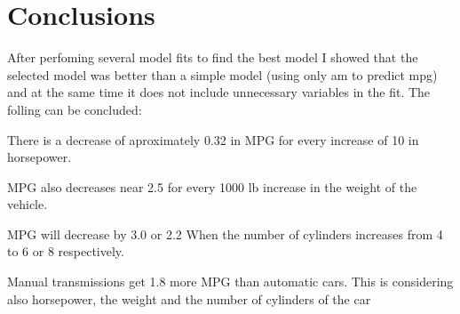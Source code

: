 \documentclass[]{article}
\begin{document}
\section{Conclusions}\label{conclusions}

After perfoming several model fits to find the best model I showed that
the selected model was better than a simple model (using only am to
predict mpg) and at the same time it does not include unnecessary
variables in the fit. The folling can be concluded:

There is a decrease of aproximately 0.32 in MPG for every increase of 10
in horsepower.

MPG also decreases near 2.5 for every 1000 lb increase in the weight of
the vehicle.

MPG will decrease by 3.0 or 2.2 When the number of cylinders increases
from 4 to 6 or 8 respectively.

Manual transmissions get 1.8 more MPG than automatic cars. This is
considering also horsepower, the weight and the number of cylinders of
the car
\end{document}
